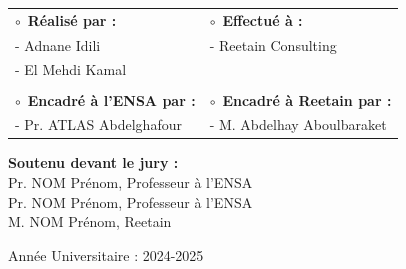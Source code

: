 \documentclass[12pt,a4paper,openany,oneside,draft]{report}
\newcommand{\circularbullet}{\textcolor{coverblue}{$\circ$}}
\begin{document}
\begin{titlepage}
\begin{center}
    \begin{center}
        \begin{tabular}{p{}p{}}
            \hspace*{0pt}\circularbullet~\textbf{\textcolor{coverblue}{Réalisé par :}} & \hspace*{0pt}\circularbullet~\textbf{\textcolor{coverblue}{Effectué à :}} \\
            \hspace{4em}-\hspace*{0.5em} Adnane Idili & \hspace{4em}-\hspace*{0.5em} Reetain Consulting \\
            \hspace{4em}-\hspace*{0.5em} El Mehdi Kamal & \\
            & \\
            \hspace*{0pt}\circularbullet~\textbf{\textcolor{coverblue}{Encadré à l'ENSA par :}} & \hspace*{0pt}\circularbullet~\textbf{\textcolor{coverblue}{Encadré à Reetain par :}} \\
            \hspace{4em}-\hspace*{0.5em} Pr. ATLAS Abdelghafour & \hspace{4em}-\hspace*{0.5em} M. Abdelhay Aboulbaraket \\
        \end{tabular}
    \end{center}
    \vspace{1cm}
    
    \begin{center}
        \textbf{\textcolor{coverblue}{Soutenu devant le jury :}}\\[0.5cm]
        Pr. NOM Prénom, Professeur à l'ENSA\\[0.3cm]
        Pr. NOM Prénom, Professeur à l'ENSA\\[0.3cm]
        M. NOM Prénom, Reetain\\[0.3cm]
    \end{center}
    \vspace{0.8cm}
    
    {\normalsize Année Universitaire : 2024-2025}
\end{center}
\end{titlepage}
\end{document}
